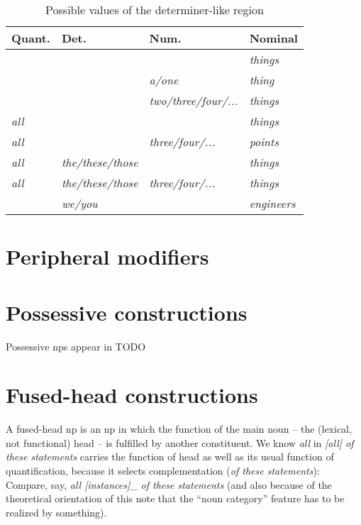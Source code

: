 \documentclass[UTF8, a4paper, oneside, scheme=plain]{ctexrep}
\newcommand{\corpus}[1]{\emph{#1}}
\begin{document}
\begin{table}[H]
    \caption{Possible values of the determiner-like region}
    \label{tbl:det-region-template}
    \centering
    \begin{tabular}{llll}
    \toprule
    Quant.       & Det.                     & Num.                        & Nominal            \\ \midrule
    \corpus{}    & \corpus{}                & \corpus{}                   & \corpus{things}    \\
    \corpus{}    & \corpus{}                & \corpus{a/one}              & \corpus{thing}     \\
    \corpus{}    & \corpus{}                & \corpus{two/three/four/...} & \corpus{things}    \\
    \corpus{all} & \corpus{}                & \corpus{}                   & \corpus{things}    \\
    \corpus{all} & \corpus{}                & \corpus{three/four/...}     & \corpus{points}    \\
    \corpus{all} & \corpus{the/these/those} & \corpus{}                   & \corpus{things}    \\
    \corpus{all} & \corpus{the/these/those} & \corpus{three/four/...}     & \corpus{things}    \\
    \corpus{}    & \corpus{we/you}          & \corpus{}                   & \corpus{engineers} \\ \midrule
    \end{tabular}
\end{table}

\section{Peripheral modifiers}

\section{Possessive constructions}

Possessive \acs{np}s appear in TODO

\section{Fused-head constructions}\label{sec:np.fused-head}

A fused-head \acs{np} is an \acs{np} in which the function of the main noun 
-- the (lexical, not functional) head -- 
is fulfilled by another constituent.
We know \corpus{all} in \corpus{[all] of these statements}
carries the function of head as well as its usual function of quantification,
because it selects complementation (\corpus{of these statements}):
Compare, say, \corpus{all [instances]_{} of these statements}
(and also because of the theoretical orientation of this note 
that the ``noun category'' feature has to be realized by something).
\end{document}
